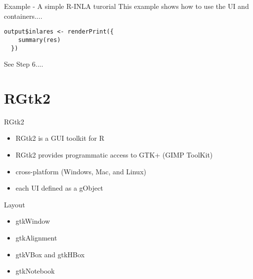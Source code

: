 \documentclass[compress]{beamer}
\begin{document}
\begin{frame}[fragile]{Example - A simple R-INLA turorial}
This example shows how to use the UI and containers....
\begin{tcolorbox}[colback=green!5,colframe=green!40!black, title=Corresponding reaction]
\begin{verbatim}
output$inlares <- renderPrint({
    summary(res)
  })
\end{verbatim}
\end{tcolorbox}
See \alert{Step 6}....
\end{frame}

\section[RGtk2]{RGtk2}
\begin{frame}{RGtk2}
\begin{itemize}
  \item RGtk2 is a GUI toolkit for R
  \item RGtk2 provides programmatic access to \alert{GTK+} (GIMP ToolKit)
  \item cross-platform (Windows, Mac, and Linux)
  \item each UI defined as a gObject
\end{itemize}
\end{frame}


\begin{frame}{Layout}
\begin{itemize}
  \item gtkWindow
  \item gtkAlignment
  \item gtkVBox and gtkHBox
  \item gtkNotebook
\end{itemize}
\end{frame}
\end{document}
